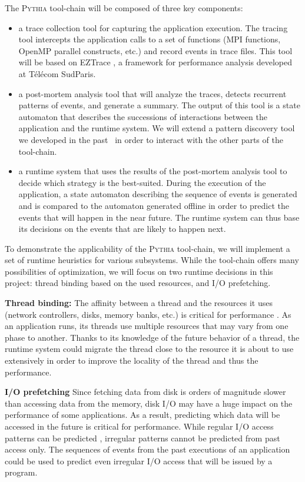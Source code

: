 \documentclass[a4paper,11pt,defblank]{article}
\newcommand{\pname}{\textsc{Pythia}\xspace}
\begin{document}
The \pname tool-chain will be composed of three key components:
\begin{itemize}
\item a trace collection tool for capturing the application
  execution. The tracing tool intercepts the application calls to a
  set of functions (MPI functions, OpenMP parallel constructs, etc.)
  and record events in trace files. This tool will be based on EZTrace
  \cite{eztrace}, a framework for performance analysis developed at
  Télécom SudParis.

\item a post-mortem analysis tool that will analyze the traces,
  detects recurrent patterns of events, and generate a summary. The
  output of this tool is a state automaton that describes the
  successions of interactions between the application and the runtime
  system. We will extend a pattern discovery tool we developed in the
  past~\cite{eztrace_pdp} in order to interact with the other parts of
  the tool-chain.

\item a runtime system that uses the results of the post-mortem
  analysis tool to decide which strategy is the best-suited. During
  the execution of the application, a state automaton describing the
  sequence of events is generated and is
  compared to the automaton generated offline in order to predict the
  events that will happen in the near future. The runtime system can
  thus base its decisions on the events that are likely to happen next.
\end{itemize}

To demonstrate the applicability of the \pname tool-chain, we will
implement a set of runtime heuristics for various subsystems. While
the tool-chain offers many possibilities of optimization, we will
focus on two runtime decisions in this project: thread binding based
on the used resources, and I/O prefetching.

\textbf{Thread binding:} The affinity between a thread and the
resources it uses (network controllers, disks, memory banks, etc.) is
critical for performance \cite{nuioa}. As an application runs, its
threads use multiple resources that may vary from one phase to
another. Thanks to its knowledge of the future behavior of a thread,
the runtime system could migrate the thread close to the resource it
is about to use extensively in order to improve the locality of the
thread and thus the performance.

\textbf{I/O prefetching} Since fetching data from disk is orders of
magnitude slower than accessing data from the memory, disk I/O may
have a huge impact on the performance of some applications. As a
result, predicting which data will be accessed in the future is
critical for performance. While regular I/O access patterns can be
predicted \cite{cao1996implementation}, irregular patterns cannot be predicted
from past access only. The sequences of events from the past
executions of an application could be used to predict even irregular
I/O access that will be issued by a program.
\end{document}
